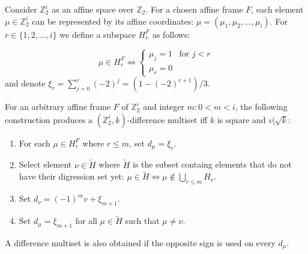 Consider $\mathbb Z_2^i$ as an affine space over $\mathbb Z_2$. For a chosen affine frame $F$, each element $\mu\in\mathbb Z_2^i$ can be represented by its affine coordinates: $\mu=(\mu_1, \mu_2, \ldots, \mu_i)$. For $r\in\{1,2,\ldots,i\}$ we define a subspace $H_r^F$ as follows:

\begin{equation}
    \mu \in H_r^F \iff 
        \begin{cases}
            \mu_j = 1 & \text{for } j < r \\
            \mu_r = 0
        \end{cases}
\end{equation}
and denote $\xi_r = \sum\limits_{j=0}^r (-2)^j=(1-(-2)^{r+1})/3$.

\begin{theorem}
    \label{z2i:theorem:construction}
    For an arbitrary affine frame $F$ of $\mathbb Z_2^i$ and integer $m \colon 0 < m < i$, the following construction produces a $(\mathbb Z_2^i, k)$-difference multiset iff $k$ is square and $v | \sqrt k$:
    \begin{enumerate}
        \item For each $\mu \in H_r^F$ where $r \leq m$, set $d_\mu = \xi_r$.
        \item Select element $\nu \in \tilde H$ where $\tilde H$ is the subset containg elements that do not have their digression set yet: $\mu \in \tilde H \iff \mu \notin \bigcup\limits_{r \leq m} H_r$.
        \item Set $d_\nu = (-1)^m v + \xi_{m+1}$.
        \item Set $d_\mu = \xi_{m+1}$ for all $\mu \in \tilde H$ such that $\mu \neq \nu$.
    \end{enumerate}
\end{theorem}

A difference multiset is also obtained if the opposite sign is used on every $d_\mu$.

